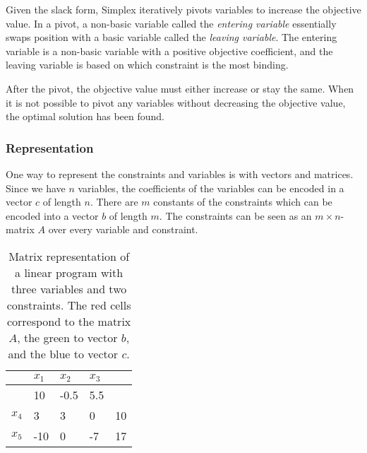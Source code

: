 Given the slack form, Simplex iteratively pivots variables to increase the objective value. In a pivot, a non-basic variable called the \textit{entering variable} essentially swaps position with a basic variable called the \textit{leaving variable}. The entering variable is a non-basic variable with a positive objective coefficient, and the leaving variable is based on which constraint is the most binding.

After the pivot, the objective value must either increase or stay the same. When it is not possible to pivot any variables without decreasing the objective value, the optimal solution has been found.

\subsubsection{Representation}
One way to represent the constraints and variables is with vectors and matrices. Since we have $n$ variables, the coefficients of the variables can be encoded in a vector $c$ of length $n$. There are $m$ constants of the constraints which can be encoded into a vector $b$ of length $m$. The constraints can be seen as an $m \times n$-matrix $A$ over every variable and constraint.
	
\begin{table}[H]
	\centering
	\label{my-label}
	\begin{tabular}{|l|l|l|l|l|}
		\hline
		& $x_1$                       & $x_2$                        & $x_3$                       &                            \\ \hline
		& \cellcolor[HTML]{ECF4FF}10  & \cellcolor[HTML]{ECF4FF}-0.5 & \cellcolor[HTML]{ECF4FF}5.5 &                            \\ \hline
		$x_4$ & \cellcolor[HTML]{FFCCC9}3   & \cellcolor[HTML]{FFCCC9}3    & \cellcolor[HTML]{FFCCC9}0   & \cellcolor[HTML]{9AFF99}10 \\ \hline
		$x_5$ & \cellcolor[HTML]{FFCCC9}-10 & \cellcolor[HTML]{FFCCC9}0    & \cellcolor[HTML]{FFCCC9}-7  & \cellcolor[HTML]{9AFF99}17 \\ \hline
	\end{tabular}
	\caption{Matrix representation of a linear program with three variables and two constraints. The red cells correspond to the matrix $A$, the green to vector $b$, and the blue to vector $c$.}
\end{table}
